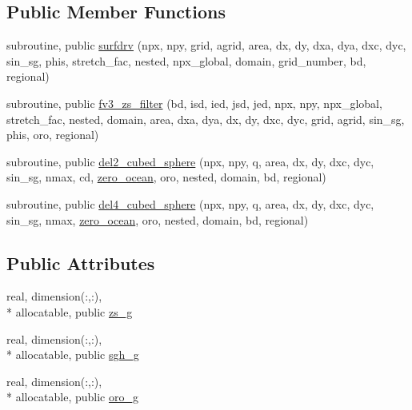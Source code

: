 \subsection*{Public Member Functions}
\begin{DoxyCompactItemize}
\item 
subroutine, public \hyperlink{classfv__surf__map__mod_a5b5120e4bc2fb8f5d845312f38736dde}{surfdrv} (npx, npy, grid, agrid, area, dx, dy, dxa, dya, dxc, dyc, sin\-\_\-sg, phis, stretch\-\_\-fac, nested, npx\-\_\-global, domain, grid\-\_\-number, bd, regional)
\item 
subroutine, public \hyperlink{classfv__surf__map__mod_a008b286b0f3c3b17f9289cf28564edbf}{fv3\-\_\-zs\-\_\-filter} (bd, isd, ied, jsd, jed, npx, npy, npx\-\_\-global, stretch\-\_\-fac, nested, domain, area, dxa, dya, dx, dy, dxc, dyc, grid, agrid, sin\-\_\-sg, phis, oro, regional)
\item 
subroutine, public \hyperlink{classfv__surf__map__mod_ac0abfc3241302c7044d4393bcdff7cd2}{del2\-\_\-cubed\-\_\-sphere} (npx, npy, q, area, dx, dy, dxc, dyc, sin\-\_\-sg, nmax, cd, \hyperlink{classfv__surf__map__mod_a08c3188d0168e655ed23ece6b7a57043}{zero\-\_\-ocean}, oro, nested, domain, bd, regional)
\item 
subroutine, public \hyperlink{classfv__surf__map__mod_a9258298f2e2e6289ec6359c717f38f54}{del4\-\_\-cubed\-\_\-sphere} (npx, npy, q, area, dx, dy, dxc, dyc, sin\-\_\-sg, nmax, \hyperlink{classfv__surf__map__mod_a08c3188d0168e655ed23ece6b7a57043}{zero\-\_\-ocean}, oro, nested, domain, bd, regional)
\end{DoxyCompactItemize}
\subsection*{Public Attributes}
\begin{DoxyCompactItemize}
\item 
real, dimension(\-:,\-:), \\*
allocatable, public \hyperlink{classfv__surf__map__mod_a39c1cec935bdd6e01b87eb1ec5187941}{zs\-\_\-g}
\item 
real, dimension(\-:,\-:), \\*
allocatable, public \hyperlink{classfv__surf__map__mod_a1f6c2740389c832c7b613cd7f0d5a407}{sgh\-\_\-g}
\item 
real, dimension(\-:,\-:), \\*
allocatable, public \hyperlink{classfv__surf__map__mod_a89960949339245bd7440d1735b7b6fa2}{oro\-\_\-g}
\end{DoxyCompactItemize}
